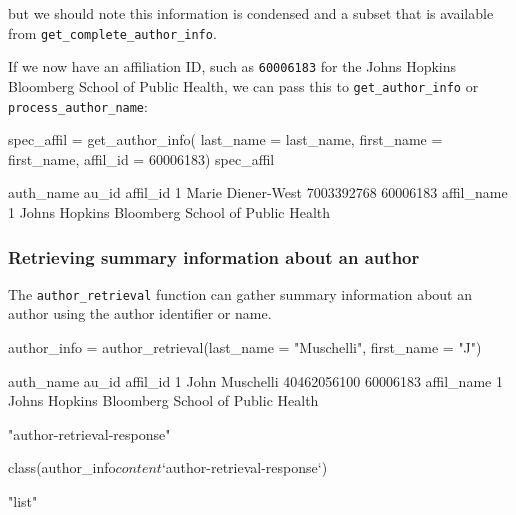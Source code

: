 but we should note this information is condensed and a subset that is
available from \texttt{get\_complete\_author\_info}.

If we now have an affiliation ID, such as \texttt{60006183} for the
Johns Hopkins Bloomberg School of Public Health, we can pass this to
\texttt{get\_author\_info} or \texttt{process\_author\_name}:

\begin{Schunk}
\begin{Sinput}
spec_affil = get_author_info(
  last_name = last_name, 
  first_name = first_name,
  affil_id = 60006183)
spec_affil
\end{Sinput}
\begin{Soutput}
          auth_name      au_id affil_id
1 Marie Diener-West 7003392768 60006183
                                       affil_name
1 Johns Hopkins Bloomberg School of Public Health
\end{Soutput}
\end{Schunk}

\hypertarget{retrieving-summary-information-about-an-author}{%
\subsubsection{Retrieving summary information about an
author}\label{retrieving-summary-information-about-an-author}}

The \texttt{author\_retrieval} function can gather summary information
about an author using the author identifier or name.

\begin{Schunk}
\begin{Sinput}
author_info = author_retrieval(last_name = "Muschelli", first_name = "J")
\end{Sinput}
\begin{Soutput}
       auth_name       au_id affil_id
1 John Muschelli 40462056100 60006183
                                       affil_name
1 Johns Hopkins Bloomberg School of Public Health
\end{Soutput}
\begin{Soutput}
[1] "author-retrieval-response"
\end{Soutput}
\begin{Sinput}
class(author_info$content$`author-retrieval-response`)
\end{Sinput}
\begin{Soutput}
[1] "list"
\end{Soutput}
\end{Schunk}

